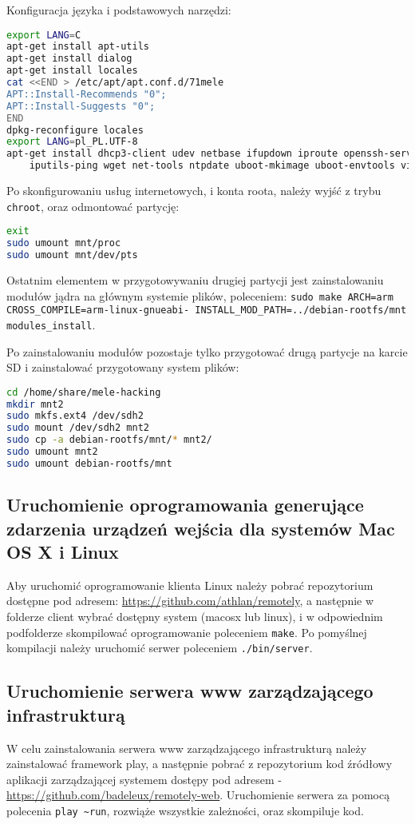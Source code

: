 Konfiguracja języka i podstawowych narzędzi:
\begin{lstlisting}[language=bash]
export LANG=C
apt-get install apt-utils
apt-get install dialog
apt-get install locales
cat <<END > /etc/apt/apt.conf.d/71mele
APT::Install-Recommends "0";
APT::Install-Suggests "0";
END
dpkg-reconfigure locales
export LANG=pl_PL.UTF-8
apt-get install dhcp3-client udev netbase ifupdown iproute openssh-server \
    iputils-ping wget net-tools ntpdate uboot-mkimage uboot-envtools vim nano less X
\end{lstlisting}

Po skonfigurowaniu usług internetowych, i konta roota, należy wyjść z trybu \lstinline{chroot}, oraz odmontować partycję:

\begin{lstlisting}[language=bash]
exit
sudo umount mnt/proc
sudo umount mnt/dev/pts
\end{lstlisting}

Ostatnim elementem w przygotowywaniu drugiej partycji jest zainstalowaniu modułów jądra na głównym systemie plików, poleceniem: \lstinline{sudo make ARCH=arm CROSS_COMPILE=arm-linux-gnueabi- INSTALL_MOD_PATH=../debian-rootfs/mnt modules_install}.

Po zainstalowaniu modułów pozostaje tylko przygotować drugą partycje na karcie SD i zainstalować przygotowany system plików:
\begin{lstlisting}[language=bash]
cd /home/share/mele-hacking
mkdir mnt2
sudo mkfs.ext4 /dev/sdh2 
sudo mount /dev/sdh2 mnt2
sudo cp -a debian-rootfs/mnt/* mnt2/
sudo umount mnt2
sudo umount debian-rootfs/mnt
\end{lstlisting}

\subsection{Uruchomienie oprogramowania generujące zdarzenia urządzeń wejścia dla systemów Mac OS X i Linux}


Aby uruchomić oprogramowanie klienta Linux należy pobrać repozytorium dostępne pod adresem: \url{https://github.com/athlan/remotely}, a następnie w folderze client wybrać dostępny system (macosx lub linux), i w odpowiednim podfolderze skompilować oprogramowanie poleceniem \lstinline{make}.
Po pomyślnej kompilacji należy uruchomić serwer poleceniem \lstinline{./bin/server}.


\subsection{Uruchomienie serwera www zarządzającego infrastrukturą}

W celu zainstalowania serwera www zarządzającego infrastrukturą należy zainstalować framework play, a następnie pobrać z repozytorium kod źródłowy aplikacji zarządzającej systemem dostępy pod adresem - \url{https://github.com/badeleux/remotely-web}. Uruchomienie serwera za pomocą polecenia \lstinline|play ~run|, rozwiąże wszystkie zależności, oraz skompiluje kod. 
